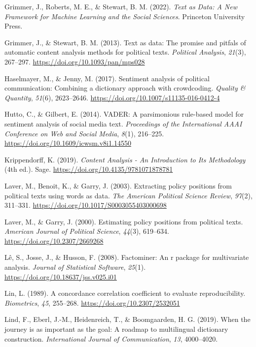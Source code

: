 \documentclass[
]{book}
\newlength{\cslhangindent}
\newenvironment{CSLReferences}[2] %
 {\begin{list}{}{%
  \setlength{\itemindent}{0pt}
  \setlength{\leftmargin}{0pt}
  \setlength{\parsep}{0pt}
  \ifodd #1
   \setlength{\leftmargin}{\cslhangindent}
   \setlength{\itemindent}{-1\cslhangindent}
  \fi
  \setlength{\itemsep}{#2\baselineskip}}}
 {\end{list}}
\begin{document}
\begin{CSLReferences}{1}{2}
Grimmer, J., Roberts, M. E., \& Stewart, B. M. (2022). \emph{{Text as Data: A New Framework for Machine Learning and the Social Sciences}}. Princeton University Press.

Grimmer, J., \& Stewart, B. M. (2013). Text as data: The promise and pitfals of automatic content analysis methods for political texts. \emph{Political Analysis}, \emph{21}(3), 267--297. \url{https://doi.org/10.1093/pan/mps028}

Haselmayer, M., \& Jenny, M. (2017). Sentiment analysis of political communication: Combining a dictionary approach with crowdcoding. \emph{Quality \& Quantity}, \emph{51}(6), 2623--2646. \url{https://doi.org/10.1007/s11135-016-0412-4}

Hutto, C., \& Gilbert, E. (2014). VADER: A parsimonious rule-based model for sentiment analysis of social media text. \emph{Proceedings of the International AAAI Conference on Web and Social Media}, \emph{8}(1), 216--225. \url{https://doi.org/10.1609/icwsm.v8i1.14550}

Krippendorff, K. (2019). \emph{{Content Analysis - An Introduction to Its Methodology}} (4th ed.). Sage. \url{https://doi.org/10.4135/9781071878781}

Laver, M., Benoit, K., \& Garry, J. (2003). Extracting policy positions from political texts using words as data. \emph{The American Political Science Review}, \emph{97}(2), 311--331. \url{https://doi.org/10.1017/S0003055403000698}

Laver, M., \& Garry, J. (2000). Estimating policy positions from political texts. \emph{American Journal of Political Science}, \emph{44}(3), 619--634. \url{https://doi.org/10.2307/2669268}

Lê, S., Josse, J., \& Husson, F. (2008). Factominer: An r package for multivariate analysis. \emph{Journal of Statistical Software}, \emph{25}(1). \url{https://doi.org/10.18637/jss.v025.i01}

Lin, L. (1989). A concordance correlation coefficient to evaluate reproducibility. \emph{Biometrics}, \emph{45}, 255--268. \url{https://doi.org/10.2307/2532051}

Lind, F., Eberl, J.-M., Heidenreich, T., \& Boomgaarden, H. G. (2019). When the journey is as important as the goal: A roadmap to multilingual dictionary construction. \emph{International Journal of Communication}, \emph{13}, 4000--4020.


\end{CSLReferences}
\end{document}
